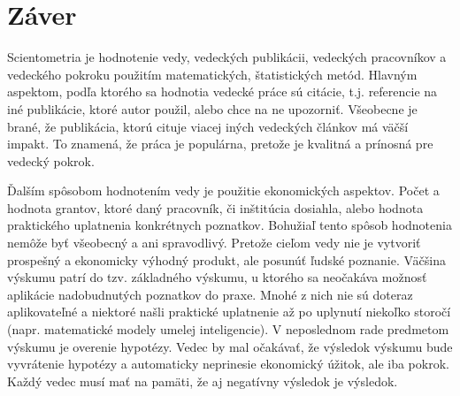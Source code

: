 \chapter*{Záver}

Scientometria je hodnotenie vedy, vedeckých publikácii, vedeckých pracovníkov a
vedeckého pokroku použitím matematických, štatistických metód. Hlavným aspektom,
podľa ktorého sa hodnotia vedecké práce sú citácie, t.j. referencie na iné
publikácie, ktoré autor použil, alebo chce na ne upozorniť. Všeobecne je brané,
že publikácia, ktorú cituje viacej iných vedeckých článkov má väčší impakt. To
znamená, že práca je populárna, pretože je kvalitná a prínosná pre vedecký
pokrok. 

Ďalším spôsobom hodnotením vedy je použitie ekonomických aspektov. Počet a
hodnota grantov, ktoré daný pracovník, či inštitúcia dosiahla, alebo hodnota
praktického uplatnenia konkrétnych poznatkov. Bohužiaľ tento spôsob hodnotenia
nemôže byť všeobecný a ani spravodlivý. Pretože cieľom vedy nie je vytvoriť
prospešný a ekonomicky výhodný produkt, ale posunúť ľudské poznanie. Väčšina
výskumu patrí do tzv. základného výskumu, u ktorého sa neočakáva možnosť
aplikácie nadobudnutých poznatkov do praxe. Mnohé z nich nie sú doteraz
aplikovateľné a niektoré našli praktické uplatnenie až po uplynutí niekoľko
storočí (napr. matematické modely umelej inteligencie). V neposlednom rade
predmetom výskumu je overenie hypotézy. Vedec by mal očakávať, že výsledok
výskumu bude vyvrátenie hypotézy a automaticky neprinesie ekonomický úžitok, ale
iba pokrok. Každý vedec musí mať na pamäti, že aj negatívny výsledok je
výsledok.

